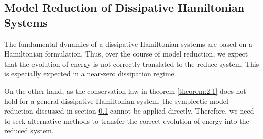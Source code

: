 \subsection{Model Reduction of Dissipative Hamiltonian Systems}

The fundamental dynamics of a dissipative Hamiltonian systems are based on a Hamiltonian formulation. Thus, over the course of model reduction, we expect that the evolution of energy is not correctly translated to the reduce system. This is especially expected in a near-zero dissipation regime.

On the other hand, as the conservation law in theorem \ref{theorem:2.1} does not hold for a general dissipative Hamiltonian system, the symplectic model reduction discussed in section \ref{} cannot be applied directly. Therefore, we need to seek alternative methods to transfer the correct evolution of energy into the reduced system.

